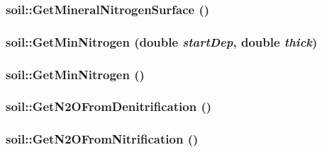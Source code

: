 \label{classsoil_a19737ddea2fab36e4ddba698aa690a23}
\hypertarget{classsoil_a21acd42a58c98c55e60216b0662d4ecf}{
\subsubsection[{GetMineralNitrogenSurface}]{ soil::GetMineralNitrogenSurface ()}}
\label{classsoil_a21acd42a58c98c55e60216b0662d4ecf}
\hypertarget{classsoil_a7b1b7b7110fd745719df083ba6292ac6}{
\subsubsection[{GetMinNitrogen}]{ soil::GetMinNitrogen (double {\em startDep}, \/  double {\em thick})}}
\label{classsoil_a7b1b7b7110fd745719df083ba6292ac6}
\hypertarget{classsoil_a200ce7594b17ce2c3561789aeb3cf81c}{
\subsubsection[{GetMinNitrogen}]{ soil::GetMinNitrogen ()}}
\label{classsoil_a200ce7594b17ce2c3561789aeb3cf81c}
\hypertarget{classsoil_ae1d8d1716f139c0999dcd5907d47aa2d}{
\subsubsection[{GetN2OFromDenitrification}]{ soil::GetN2OFromDenitrification ()}}
\label{classsoil_ae1d8d1716f139c0999dcd5907d47aa2d}
\hypertarget{classsoil_aed2c30f9e15bc87564798a5bc67416b7}{
\subsubsection[{GetN2OFromNitrification}]{ soil::GetN2OFromNitrification ()}}
